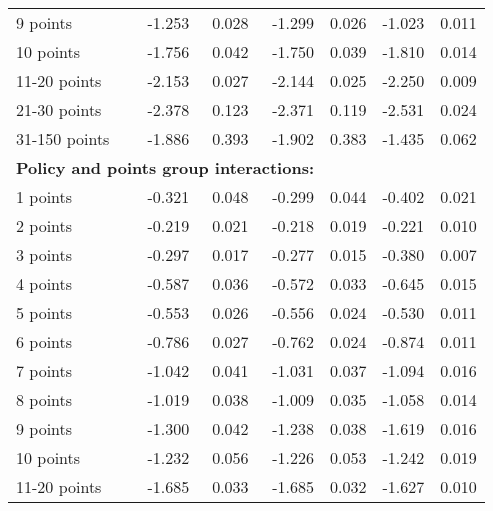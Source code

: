 \begin{table}
\begin{tabular}{l r r r r r r}
9 points  & -1.253  &  0.028  & -1.299  &  0.026  & -1.023  &  0.011   \\ 
 
10 points  & -1.756  &  0.042  & -1.750  &  0.039  & -1.810  &  0.014   \\ 
 
11-20 points  & -2.153  &  0.027  & -2.144  &  0.025  & -2.250  &  0.009   \\ 
 
21-30 points  & -2.378  &  0.123  & -2.371  &  0.119  & -2.531  &  0.024   \\ 
 
31-150 points  & -1.886  &  0.393  & -1.902  &  0.383  & -1.435  &  0.062   \\ 
 

\hline 
 
\multicolumn{4}{l}{\textbf{Policy and points group interactions:}}  \\ 
 
1 points  & -0.321  &  0.048  & -0.299  &  0.044  & -0.402  &  0.021   \\ 
 
2 points  & -0.219  &  0.021  & -0.218  &  0.019  & -0.221  &  0.010   \\ 
 
3 points  & -0.297  &  0.017  & -0.277  &  0.015  & -0.380  &  0.007   \\ 
 
4 points  & -0.587  &  0.036  & -0.572  &  0.033  & -0.645  &  0.015   \\ 
 
5 points  & -0.553  &  0.026  & -0.556  &  0.024  & -0.530  &  0.011   \\ 
 
6 points  & -0.786  &  0.027  & -0.762  &  0.024  & -0.874  &  0.011   \\ 
 
7 points  & -1.042  &  0.041  & -1.031  &  0.037  & -1.094  &  0.016   \\ 
 
8 points  & -1.019  &  0.038  & -1.009  &  0.035  & -1.058  &  0.014   \\ 
 
9 points  & -1.300  &  0.042  & -1.238  &  0.038  & -1.619  &  0.016   \\ 
 
10 points  & -1.232  &  0.056  & -1.226  &  0.053  & -1.242  &  0.019   \\ 
 
11-20 points  & -1.685  &  0.033  & -1.685  &  0.032  & -1.627  &  0.010   \\ 
 

\end{tabular}
\end{table}
